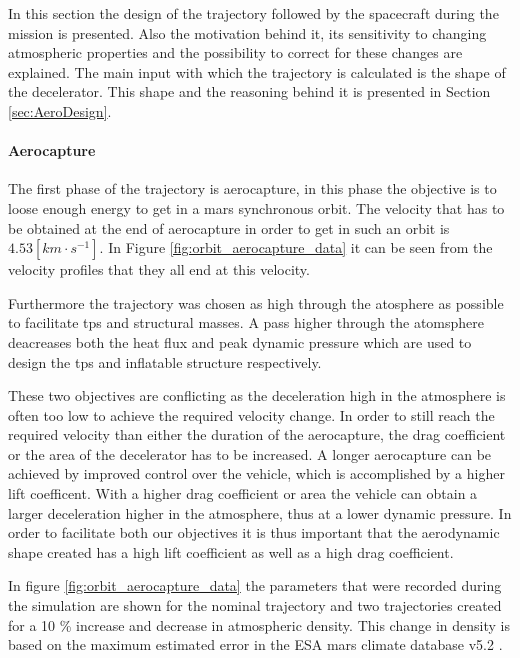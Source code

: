 In this section the design of the trajectory followed by the spacecraft during the mission is presented. Also the motivation behind it, its sensitivity to changing atmospheric properties and the possibility to correct for these changes are explained. The main input with which the trajectory is calculated is the shape of the decelerator. This shape and the reasoning behind it is presented in Section \ref{sec:AeroDesign}.

\paragraph{Aerocapture}
The first phase of the trajectory is aerocapture, in this phase the objective is to loose enough energy to get in a mars synchronous orbit. The velocity that has to be obtained at the end of aerocapture in order to get in such an orbit is $4.53 \left[km \cdot s^{-1}\right]$. In Figure \ref{fig:orbit_aerocapture_data} it can be seen from the velocity profiles that they all end at this velocity.

Furthermore the trajectory was chosen as high through the atosphere as possible to facilitate \gls{tps} and structural masses. A pass higher through the atomsphere deacreases both the heat flux and peak dynamic pressure which are used to design the \gls{tps} and inflatable structure respectively.

These two objectives are conflicting as the deceleration high in the atmosphere is often too low to achieve the required velocity change. In order to still reach the required velocity than either the duration of the aerocapture, the drag coefficient or the area of the decelerator has to be increased. A longer aerocapture can be achieved by improved control over the vehicle, which is accomplished by a higher lift coefficent. With a higher drag coefficient or area the vehicle can obtain a larger deceleration higher in the atmosphere, thus at a lower dynamic pressure. In order to facilitate both our objectives it is thus important that the aerodynamic shape created has a high lift coefficient as well as a high drag coefficient.

In figure \ref{fig:orbit_aerocapture_data} the parameters that were recorded during the simulation are shown for the nominal trajectory and two trajectories created for a 10 \% increase and decrease in atmospheric density. This change in density is based on the maximum estimated error in the ESA mars climate database v5.2 \cite{Lewis2015}.

